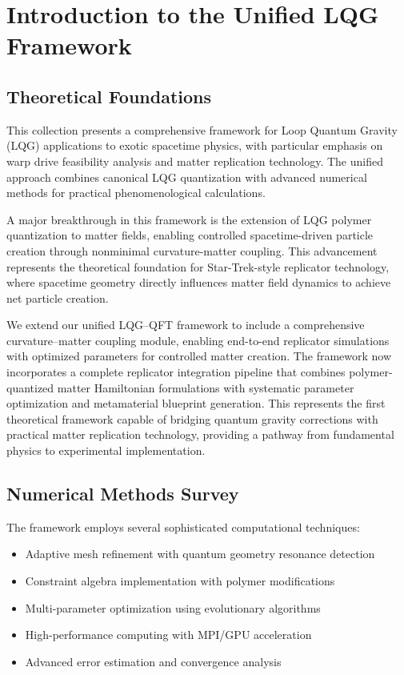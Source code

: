 \documentclass[11pt]{article}
\begin{document}
\section*{Introduction to the Unified LQG Framework}

\subsection*{Theoretical Foundations}
This collection presents a comprehensive framework for Loop Quantum Gravity (LQG) applications to exotic spacetime physics, with particular emphasis on warp drive feasibility analysis and matter replication technology. The unified approach combines canonical LQG quantization with advanced numerical methods for practical phenomenological calculations.

A major breakthrough in this framework is the extension of LQG polymer quantization to matter fields, enabling controlled spacetime-driven particle creation through nonminimal curvature-matter coupling. This advancement represents the theoretical foundation for Star-Trek-style replicator technology, where spacetime geometry directly influences matter field dynamics to achieve net particle creation.

We extend our unified LQG–QFT framework to include a comprehensive curvature–matter coupling module, enabling end-to-end replicator simulations with optimized parameters for controlled matter creation. The framework now incorporates a complete replicator integration pipeline that combines polymer-quantized matter Hamiltonian formulations with systematic parameter optimization and metamaterial blueprint generation. This represents the first theoretical framework capable of bridging quantum gravity corrections with practical matter replication technology, providing a pathway from fundamental physics to experimental implementation.

\subsection*{Numerical Methods Survey}
The framework employs several sophisticated computational techniques:
\begin{itemize}
  \item Adaptive mesh refinement with quantum geometry resonance detection
  \item Constraint algebra implementation with polymer modifications
  \item Multi-parameter optimization using evolutionary algorithms
  \item High-performance computing with MPI/GPU acceleration
  \item Advanced error estimation and convergence analysis
\end{itemize}
\end{document}

